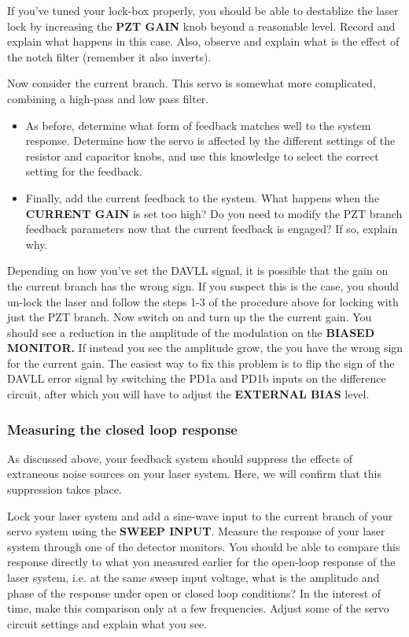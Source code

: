 \documentclass{../lab}
\begin{document}
If you've tuned your lock-box properly, you should be able to destablize the laser lock by increasing the \textbf{PZT GAIN} knob beyond a reasonable level. Record and explain what happens in this case. Also, observe and explain what is the effect of the notch filter (remember it also inverts).

Now consider the current branch. This servo is somewhat more complicated, combining a high-pass and low pass filter.

\begin{itemize}
    \item As before, determine what form of feedback matches well to the system response. Determine how the servo is affected by the different settings of the resistor and capacitor knobs, and use this knowledge to select the correct setting for the feedback.

    \item Finally, add the current feedback to the system. What happens when the \textbf{CURRENT GAIN} is set too high? Do you need to modify the PZT branch feedback parameters now that the current feedback is engaged? If so, explain why.
\end{itemize}

Depending on how you've set the DAVLL signal, it is possible that the gain on the current branch has the wrong sign. If you suspect this is the case, you should un-lock the laser and follow the steps 1-3 of the procedure above for locking with just the PZT branch. Now switch on and turn up the the current gain. You should see a reduction in the amplitude of the modulation on the \textbf{BIASED MONITOR.} If instead you see the amplitude grow, the you have the wrong sign for the current gain. The easiest way to fix this problem is to flip the sign of the DAVLL error signal by switching the PD1a and PD1b inputs on the difference circuit, after which you will have to adjust the \textbf{EXTERNAL BIAS} level.

\subsubsection{Measuring the closed loop response}

As discussed above, your feedback system should suppress the effects of extraneous noise sources on your laser system. Here, we will confirm that this suppression takes place.

Lock your laser system and add a sine-wave input to the current branch of your servo system using the \textbf{SWEEP INPUT}. Measure the response of your laser system through one of the detector monitors. You should be able to compare this response directly to what you measured earlier for the open-loop response of the laser system, i.e. at the same sweep input voltage, what is the amplitude and phase of the response under open or closed loop conditions? In the interest of time, make this comparison only at a few frequencies. Adjust some of the servo circuit settings and explain what you see.
\end{document}
